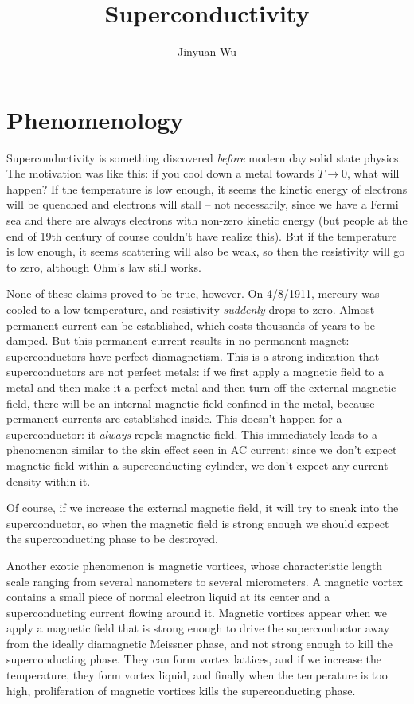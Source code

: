 \documentclass[hyperref, a4paper]{article}
\title{Superconductivity}
\author{Jinyuan Wu}
\begin{document}
\maketitle

\section{Phenomenology}

Superconductivity is something discovered \emph{before} 
modern day solid state physics.
The motivation was like this:
if you cool down a metal towards $T \to 0$,
what will happen?
If the temperature is low enough, 
it seems the kinetic energy of electrons will be quenched 
and electrons will stall -- 
not necessarily, since we have a Fermi sea 
and there are always electrons with non-zero kinetic energy 
(but people at the end of 19th century of course couldn't have realize this).
But if the temperature is low enough, 
it seems scattering will also be weak, 
so then the resistivity will go to zero, 
although Ohm's law still works.

None of these claims proved to be true, however.
On 4/8/1911, mercury was cooled to a low temperature,
and resistivity \emph{suddenly} drops to zero.
Almost permanent current can be established,
which costs thousands of years to be damped.
But this permanent current results in no permanent magnet:
superconductors have perfect diamagnetism.
This is a strong indication that superconductors are not perfect metals:
if we first apply a magnetic field to a metal 
and then make it a perfect metal and then 
turn off the external magnetic field, 
there will be an internal magnetic field confined in the metal,
because permanent currents are established inside.
This doesn't happen for a superconductor:
it \emph{always} repels magnetic field.
This immediately leads to a phenomenon similar to the skin effect seen in AC current:
since we don't expect magnetic field within a superconducting cylinder,
we don't expect any current density within it.

Of course, if we increase the external magnetic field, 
it will try to sneak into the superconductor,
so when the magnetic field is strong enough 
we should expect the superconducting phase to be destroyed.

Another exotic phenomenon is magnetic vortices,
whose characteristic length scale 
ranging from several nanometers to several micrometers.
A magnetic vortex contains a small piece of normal electron liquid at its center 
and a superconducting current flowing around it.
Magnetic vortices appear when we apply a magnetic field that is strong enough 
to drive the superconductor away from the ideally diamagnetic Meissner phase, 
and not strong enough to kill the superconducting phase.
They can form vortex lattices,
and if we increase the temperature, 
they form vortex liquid, 
and finally when the temperature is too high, 
proliferation of magnetic vortices kills the superconducting phase.
\end{document}
